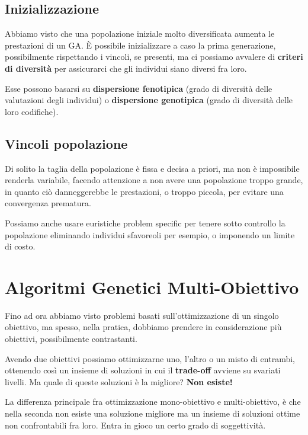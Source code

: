         \subsection{Inizializzazione}
            Abbiamo visto che una popolazione iniziale molto diversificata aumenta le prestazioni di un GA. È possibile inizializzare a caso la prima generazione, possibilmente rispettando i vincoli, se presenti, ma ci possiamo avvalere di \textbf{criteri di diversità} per assicurarci che gli individui siano diversi fra loro.
            
            Esse possono basarsi su \textbf{dispersione fenotipica} (grado di diversità delle valutazioni degli individui) o \textbf{dispersione genotipica} (grado di diversità delle loro codifiche).
            
        \subsection{Vincoli popolazione}
            Di solito la taglia della popolazione è fissa e decisa a priori, ma non è impossibile renderla variabile, facendo attenzione a non avere una popolazione troppo grande, in quanto ciò danneggerebbe le prestazioni, o troppo piccola, per evitare una convergenza prematura.
            
            Possiamo anche usare euristiche problem specific per tenere sotto controllo la popolazione eliminando individui sfavoreoli per esempio, o imponendo un limite di costo.
            
\section{Algoritmi Genetici Multi-Obiettivo}
    Fino ad ora abbiamo visto problemi basati sull'ottimizzazione di un singolo obiettivo, ma spesso, nella pratica, dobbiamo prendere in considerazione più obiettivi, possibilmente contrastanti.
    
    Avendo due obiettivi possiamo ottimizzarne uno, l'altro o un misto di entrambi, ottenendo così un insieme di soluzioni in cui il \textbf{trade-off} avviene su svariati livelli. Ma quale di queste soluzioni è la migliore? \textbf{Non esiste!}
    
    La differenza principale fra ottimizzazione mono-obiettivo e multi-obiettivo, è che nella seconda non esiste una soluzione migliore ma un insieme di soluzioni ottime non confrontabili fra loro. Entra in gioco un certo grado di soggettività.
    
